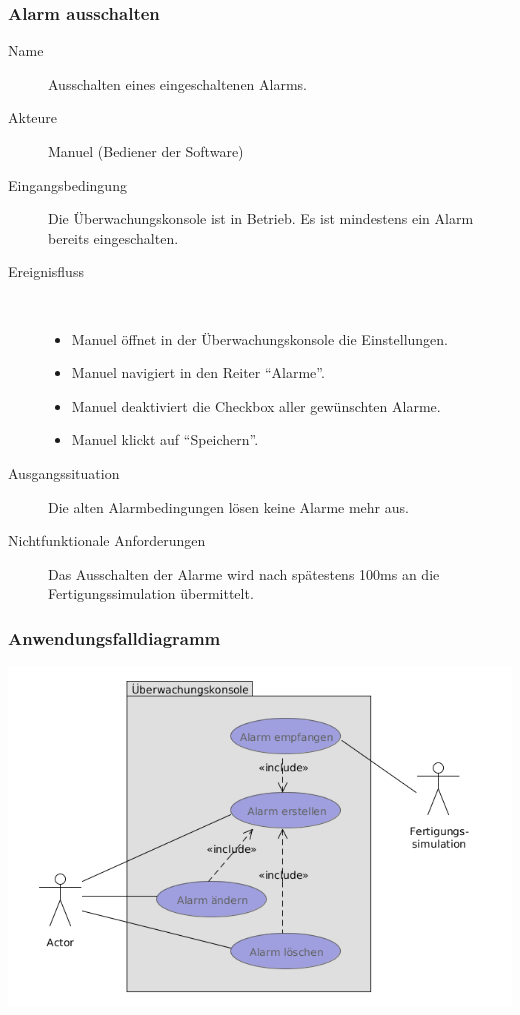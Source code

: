 \documentclass[parskip=full]{scrartcl}
\begin{document}
\subsubsection{Alarm ausschalten}
\begin{description}
 \item[Name] Ausschalten eines eingeschaltenen Alarms.
 \item[Akteure] Manuel (Bediener der Software)
 \item[Eingangsbedingung] Die \"Uberwachungskonsole ist in Betrieb. Es ist mindestens ein Alarm bereits eingeschalten.
 \item[Ereignisfluss]~\\
 \begin{itemize}[noitemsep]
  \item Manuel \"offnet in der \"Uberwachungskonsole die Einstellungen.
  \item Manuel navigiert in den Reiter "`Alarme"'.
  \item Manuel deaktiviert die Checkbox aller gew\"unschten Alarme.
  \item Manuel klickt auf "`Speichern"'.
 \end{itemize}
 \item[Ausgangssituation] Die alten Alarmbedingungen l\"osen keine Alarme mehr aus.
 \item [Nichtfunktionale Anforderungen] Das Ausschalten der Alarme wird nach sp\"atestens 100ms an die Fertigungssimulation \"ubermittelt.
\end{description}

\subsubsection{Anwendungsfalldiagramm}
\begin{center}
  \includegraphics[scale=0.7]{media/UseCases/Ueberwachungskonsole.png}
\end{center}
\end{document}
